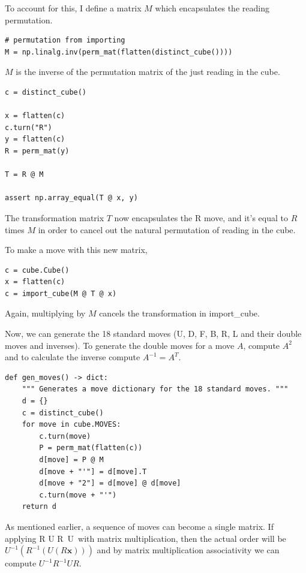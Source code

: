 \documentclass[11pt, oneside]{article}
\newcommand{\dash}{\textquotesingle}
\newcommand{\ve}[1]{\mathbf{#1}}
\theoremstyle{plain}
\begin{document}
To account for this, I define a matrix \( M \)
which encapsulates the reading permutation.

\begin{verbatim}
# permutation from importing
M = np.linalg.inv(perm_mat(flatten(distinct_cube())))
\end{verbatim}

\( M \) is the inverse of the permutation matrix of the just reading in the cube.

\begin{verbatim}
c = distinct_cube()

x = flatten(c)
c.turn("R")
y = flatten(c)
R = perm_mat(y)

T = R @ M

assert np.array_equal(T @ x, y)
\end{verbatim}

The transformation matrix \( T \) now encapsulates the R move,
and it's equal to \( R \) times \( M \) in order to cancel out the natural permutation of reading in the cube.

To make a move with this new matrix,

\begin{verbatim}
c = cube.Cube()
x = flatten(c)
c = import_cube(M @ T @ x)
\end{verbatim}

Again, multiplying by \( M \) cancels the transformation in import\_cube.

Now, we can generate the 18 standard moves (U, D, F, B, R, L and their double moves
and inverses). To generate the double moves for a move \( A \), compute \( A^2 \) and to calculate the inverse compute \( A^{-1} = A^T \).

\begin{verbatim}
def gen_moves() -> dict:
    """ Generates a move dictionary for the 18 standard moves. """
    d = {}
    c = distinct_cube()
    for move in cube.MOVES:
        c.turn(move)
        P = perm_mat(flatten(c))
        d[move] = P @ M
        d[move + "'"] = d[move].T
        d[move + "2"] = d[move] @ d[move]
        c.turn(move + "'")
    return d
\end{verbatim}

As mentioned earlier, a sequence of moves can become a single matrix.
If applying R U R\dash \ U\dash \ with matrix multiplication, then
the actual order will be \( U^{-1}(R^{-1}(U(R\ve{x}))) \)
and by matrix multiplication associativity we can compute \( U^{-1} R^{-1} U R \).
\end{document}
